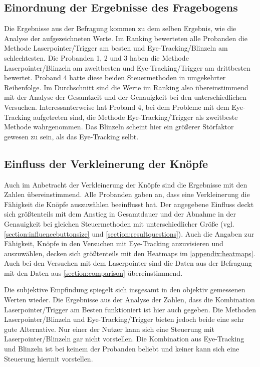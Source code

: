 \subsection{Einordnung der Ergebnisse des Fragebogens}
Die Ergebnisse aus der Befragung kommen zu dem selben Ergebnis, wie die Analyse der aufgezeichneten Werte. Im Ranking bewerteten alle Probanden die Methode Laserpointer/Trigger am besten und Eye-Tracking/Blinzeln am schlechtesten. Die Probanden 1, 2 und 3 haben die Methode Laserpointer/Blinzeln am zweitbesten und Eye-Tracking/Trigger am drittbesten bewertet. Proband 4 hatte diese beiden Steuermethoden in umgekehrter Reihenfolge. Im Durchschnitt sind die Werte im Ranking also übereinstimmend mit der Analyse der Gesamtzeit und der Genauigkeit bei den unterschiedlichen Versuchen. Interessanterweise hat Proband 4, bei dem Probleme mit dem Eye-Tracking aufgetreten sind, die Methode Eye-Tracking/Trigger als zweitbeste Methode wahrgenommen. Das Blinzeln scheint hier ein größerer Störfaktor gewesen zu sein, als das Eye-Tracking selbt. 

\subsection{Einfluss der Verkleinerung der Knöpfe}
Auch im Anbetracht der Verkleinerung der Knöpfe sind die Ergebnisse mit den Zahlen übereinstimmend. Alle Probanden gaben an, dass eine Verkleinerung die Fähigkeit die Knöpfe auszuwählen beeinflusst hat. Der angegebene Einfluss deckt sich größtenteils mit dem Anstieg in Gesamtdauer und der Abnahme in der Genauigkeit bei gleichen Steuermethoden mit unterschiedlicher Größe (vgl. \autoref{section:influencebuttonsize} und \autoref{section:resultquestions}). Auch die Angaben zur Fähigkeit, Knöpfe in den Versuchen mit Eye-Tracking anzuvisieren und auszuwählen, decken sich größtenteils mit den Heatmaps im \autoref{appendix:heatmaps}. Auch bei den Versuchen mit dem Laserpointer sind die Daten aus der Befragung mit den Daten aus \autoref{section:comparison} übereinstimmend. 

Die subjektive Empfindung spiegelt sich insgesamt in den objektiv gemessenen Werten wieder. Die Ergebnisse aus der Analyse der Zahlen, dass die Kombination Laserpointer/Trigger am Besten funktioniert ist hier auch gegeben. Die Methoden Laserpointer/Blinzeln und Eye-Tracking/Trigger bieten jedoch beide eine sehr gute Alternative. Nur einer der Nutzer kann sich eine Steuerung mit Laserpointer/Blinzeln gar nicht vorstellen. Die Kombination aus Eye-Tracking und Blinzeln ist bei keinem der Probanden beliebt und keiner kann sich eine Steuerung hiermit vorstellen.

